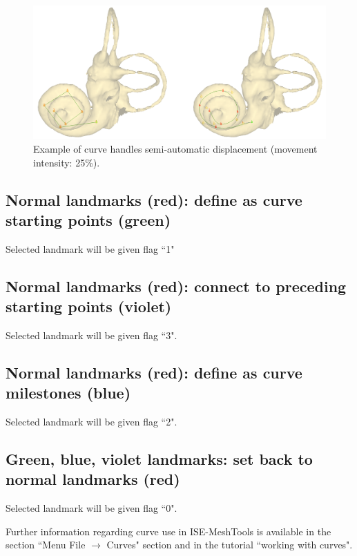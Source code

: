 \begin{figure}
  \centering
  \includegraphics[scale=0.25]{images/Edit_selected_landmarks/Move_selected_handles_input_output.png} 
	\caption{Example of curve handles semi-automatic displacement (movement intensity: 25\%).}
\label{move_handles2}
 
\end{figure}





\subsection{Normal landmarks (red): define as curve starting points (green)}
Selected landmark will be given flag ``1"


\subsection{Normal landmarks (red): connect to preceding starting points (violet)}
Selected landmark will be given flag ``3".


\subsection{Normal landmarks (red): define as curve milestones (blue)}
Selected landmark will be given flag ``2".

\subsection{Green, blue, violet landmarks: set back to normal landmarks (red)}
Selected landmark will be given flag ``0".


Further information regarding curve use in ISE-MeshTools is available in the section ``Menu File $\rightarrow$
Curves" section and in the tutorial ``working with curves".